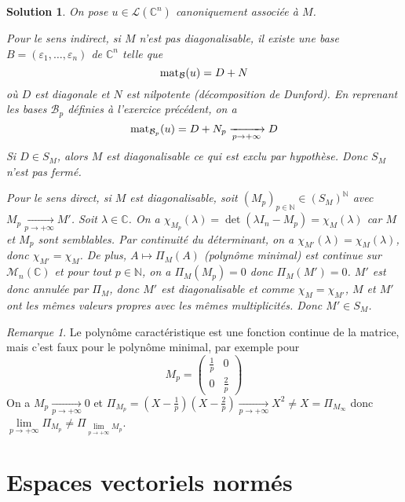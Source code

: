 \documentclass[12pt]{article}
\newtheorem{solution}{Solution}[section]
\theoremstyle{remark}
\newtheorem{remark}{Remarque}[section]
\newcommand{\C}{\mathbb{C}} \newcommand{\Q}{\mathbb{Q}}
\newcommand{\N}{\mathbb{N}} \newcommand{\Z}{\mathbb{Z}}
\newcommand{\M}{\mathcal{M}} \renewcommand{\L}{\mathcal{L}}
\begin{document}
\begin{solution}
	On pose $u\in\L(\C^{n})$ canoniquement associée à $M$. 

	Pour le sens indirect, si $M$ n'est pas diagonalisable, il existe une base $B=(\varepsilon_{1},\dots,\varepsilon_{n})$ de $\C^{n}$ telle que 
	$$\operatorname{mat}\limits_{\mathcal{B}}(u)=D+N$$
	où $D$ est diagonale et $N$ est nilpotente (décomposition de Dunford). En reprenant les bases $\mathcal{B}_{p}$ définies à l'exercice précédent, on a
	$$\operatorname{mat}\limits_{\mathcal{B}_{p}}(u)=D+N_{p}\xrightarrow[p\to+\infty]{}D$$
	Si $D\in S_{M}$, alors $M$ est diagonalisable ce qui est exclu par hypothèse. Donc $S_{M}$ n'est pas fermé.

	Pour le sens direct, si $M$ est diagonalisable, soit $(M_{p})_{p\in\N}\in(S_{M})^{\N}$ avec $M_{p}\xrightarrow[p\to+\infty]{}M'$. Soit $\lambda\in\C$. On a $\chi_{M_{p}}(\lambda)=\det(\lambda I_{n}-M_{p})=\chi_{M}(\lambda)$ car $M$ et $M_{p}$ sont semblables. Par continuité du déterminant, on a $\chi_{M'}(\lambda)=\chi_{M}(\lambda)$, donc $\chi_{M'}=\chi_{M}$. De plus, $A\mapsto\Pi_{M}(A)$ (polynôme minimal) est continue sur $\M_{n}(\C)$ et pour tout $p\in\N$, on a $\Pi_{M}(M_{p})=0$ donc $\Pi_{M}(M')=0$. $M'$ est donc annulée par $\Pi_{M}$, donc $M'$ est diagonalisable et comme $\chi_{M}=\chi_{M'}$, $M$ et $M'$ ont les mêmes valeurs propres avec les mêmes multiplicités. Donc $M'\in S_{M}$.
\end{solution}

\begin{remark}
	Le polynôme caractéristique est une fonction continue de la matrice, mais c'est faux pour le polynôme minimal, par exemple pour 
	$$M_{p}=\begin{pmatrix}
		\frac{1}{p} &0\\
		0 & \frac{2}{p}
	\end{pmatrix}$$
	On a $M_{p}\xrightarrow[p\to+\infty]{}0$ et $\Pi_{M_{p}}=(X-\frac{1}{p})(X-\frac{2}{p})\xrightarrow[p\to+\infty]{} X^{2}\neq X=\Pi_{M_{\infty}}$ donc $\lim\limits_{p\to+\infty}\Pi_{M_p}\neq\Pi_{\lim\limits_{p\to+\infty}M_{p}}$.
\end{remark}

\cleardoublepage
\section{Espaces vectoriels normés}
\end{document}
